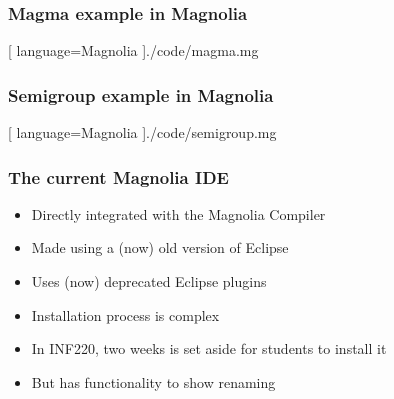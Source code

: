 \showlogo

\begin{frame}
  \frametitle{Magma example in Magnolia}
  \begin{center}
    
    [ language=Magnolia
    ]{./code/magma.mg}
  \end{center}
\end{frame}

\begin{frame}
  \frametitle{Semigroup example in Magnolia}
  \begin{center}
    
    [ language=Magnolia
    ]{./code/semigroup.mg}
  \end{center}
\end{frame}

\begin{frame}
  \frametitle{The current Magnolia IDE}
  \pause
  \begin{itemize}
    \item Directly integrated with the Magnolia Compiler
      \pause
    \item Made using a (now) old version of Eclipse
      \pause
    \item Uses (now) deprecated Eclipse plugins
      \pause
    \item Installation process is complex
      \pause
    \item In INF220, two weeks is set aside for students to install it
      \pause
    \item But has functionality to show renaming
  \end{itemize}
\end{frame}
